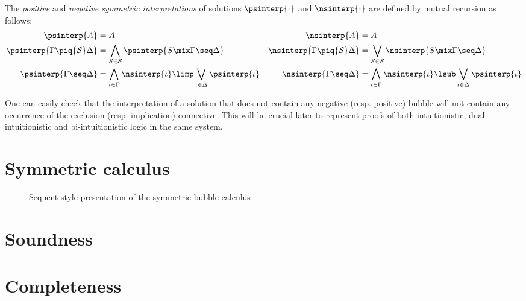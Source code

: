 \begin{definition}
  The \emph{positive} and \emph{negative symmetric interpretations} of solutions
  $\psinterp{\cdot}$ and $\nsinterp{\cdot}$ are defined by mutual recursion as
  follows:
  \begin{align*}
    \psinterp{A} &= A &
    \nsinterp{A} &= A \\
    \psinterp{\Gamma \piq{\mathcal{S}} \Delta} &=
      \bigwedge_{S \in \mathcal{S}} \psinterp{S \mix \Gamma \seq \Delta} &
    \nsinterp{\Gamma \piq{\mathcal{S}} \Delta} &=
      \bigvee_{S \in \mathcal{S}} \nsinterp{S \mix \Gamma \seq \Delta} \\
    \psinterp{\Gamma \seq \Delta} &=
      \bigwedge_{\iota \in \Gamma} \nsinterp{\iota} \limp \bigvee_{\iota \in \Delta} \psinterp{\iota} &
    \nsinterp{\Gamma \seq \Delta} &=
      \bigwedge_{\iota \in \Gamma} \nsinterp{\iota} \lsub \bigvee_{\iota \in \Delta} \psinterp{\iota}
  \end{align*}
\end{definition}

One can easily check that the interpretation of a solution that does not contain
any negative (resp. positive) bubble will not contain any occurrence of the
exclusion (resp. implication) connective. This will be crucial later to
represent proofs of both intuitionistic, dual-intuitionistic and
bi-intuitionistic logic in the same system.

\section{Symmetric calculus}

\begin{figure*}
  
  \caption{Sequent-style presentation of the symmetric bubble calculus }
\end{figure*}

\section{Soundness}


\section{Completeness}

